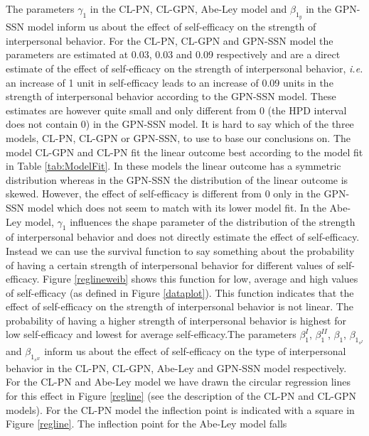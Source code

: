 \documentclass[man]{apa6}
\theoremstyle{definition}
\theoremstyle{definition}
\theoremstyle{definition}
\theoremstyle{remark}
\begin{document}
The parameters \(\gamma_1\) in the CL-PN, CL-GPN, Abe-Ley model and
\(\beta_{1_y}\) in the GPN-SSN model inform us about the effect of
self-efficacy on the strength of interpersonal behavior. For the CL-PN,
CL-GPN and GPN-SSN model the parameters are estimated at 0.03, 0.03 and
0.09 respectively and are a direct estimate of the effect of
self-efficacy on the strength of interpersonal behavior, \emph{i.e.} an
increase of 1 unit in self-efficacy leads to an increase of 0.09 units
in the strength of interpersonal behavior according to the GPN-SSN
model. These estimates are however quite small and only different from 0
(the HPD interval does not contain 0) in the GPN-SSN model. It is hard
to say which of the three models, CL-PN, CL-GPN or GPN-SSN, to use to
base our conclusions on. The model CL-GPN and CL-PN fit the linear
outcome best according to the model fit in Table \ref{tab:ModelFit}. In
these models the linear outcome has a symmetric distribution whereas in
the GPN-SSN the distribution of the linear outcome is skewed. However,
the effect of self-efficacy is different from 0 only in the GPN-SSN
model which does not seem to match with its lower model fit.\newline
\indent In the Abe-Ley model, \(\gamma_1\) influences the shape
parameter of the distribution of the strength of interpersonal behavior
and does not directly estimate the effect of self-efficacy. Instead we
can use the survival function to say something about the probability of
having a certain strength of interpersonal behavior for different values
of self-efficacy. Figure \ref{reglineweib} shows this function for low,
average and high values of self-efficacy (as defined in Figure
\ref{dataplot}). This function indicates that the effect of
self-efficacy on the strength of interpersonal behavior is not linear.
The probability of having a higher strength of interpersonal behavior is
highest for low self-efficacy and lowest for average
self-efficacy.\newline \indent The parameters \(\beta_1^{I}\),
\(\beta_1^{II}\), \(\beta_1\), \(\beta_{1_{s^{I}}}\) and
\(\beta_{1_{s^{II}}}\) inform us about the effect of self-efficacy on
the type of interpersonal behavior in the CL-PN, CL-GPN, Abe-Ley and
GPN-SSN model respectively. For the CL-PN and Abe-Ley model we have
drawn the circular regression lines for this effect in Figure
\ref{regline} (see the description of the CL-PN and CL-GPN models). For
the CL-PN model the inflection point is indicated with a square in
Figure \ref{regline}. The inflection point for the Abe-Ley model falls
\end{document}

